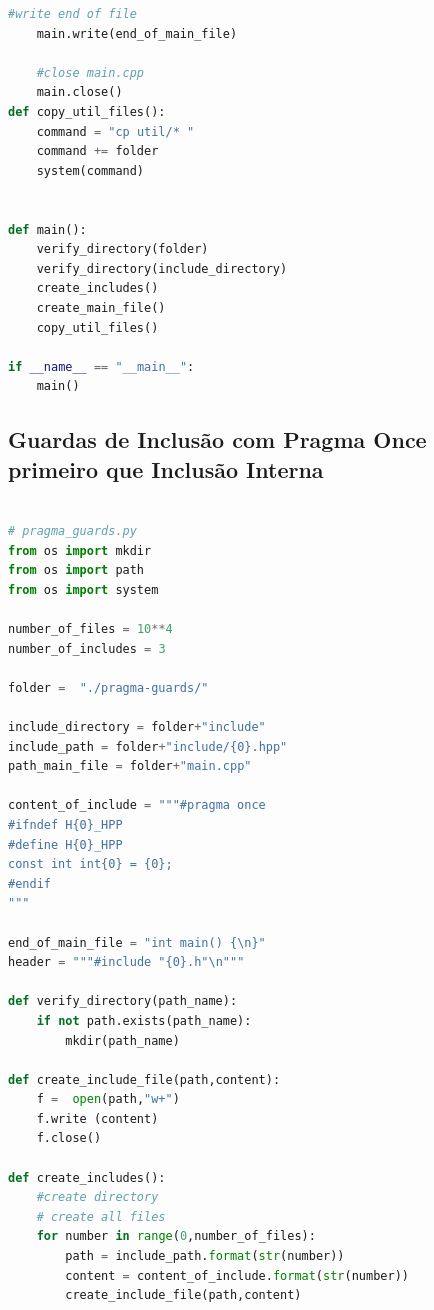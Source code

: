 \begin{apendicesenv}
\begin{lstlisting}[language=Python, caption={
Script Guardas de Inclusão Interna primeiro que \textit{Pragma Once}},
                   label=script_guards_pragma_include]
    #write end of file
    main.write(end_of_main_file)

    #close main.cpp
    main.close()
def copy_util_files():                                                           
    command = "cp util/* "                                                       
    command += folder                                                            
    system(command)                                                              
                    

def main():
    verify_directory(folder)
    verify_directory(include_directory)
    create_includes()
    create_main_file()
    copy_util_files()

if __name__ == "__main__":
    main()
\end{lstlisting}

\subsection{Guardas de Inclusão com Pragma Once primeiro que Inclusão Interna}
\begin{lstlisting}[language=Python, caption={
    Script \textit{Pragma Once} primeiro que Guardas de Inclusão Interna},label=script_pragma_guards_include]
    
# pragma_guards.py
from os import mkdir
from os import path
from os import system

number_of_files = 10**4
number_of_includes = 3

folder =  "./pragma-guards/"

include_directory = folder+"include"
include_path = folder+"include/{0}.hpp"
path_main_file = folder+"main.cpp"

content_of_include = """#pragma once
#ifndef H{0}_HPP
#define H{0}_HPP
const int int{0} = {0};
#endif
"""

end_of_main_file = "int main() {\n}"
header = """#include "{0}.h"\n"""

def verify_directory(path_name):
    if not path.exists(path_name):
        mkdir(path_name)

def create_include_file(path,content):
    f =  open(path,"w+")
    f.write (content)
    f.close()

def create_includes():
    #create directory
    # create all files
    for number in range(0,number_of_files):
        path = include_path.format(str(number))
        content = content_of_include.format(str(number))
        create_include_file(path,content)
    

\end{lstlisting}
\end{apendicesenv}
